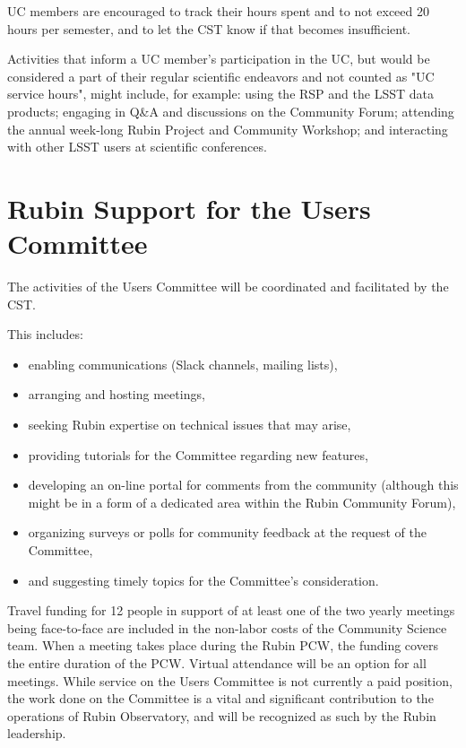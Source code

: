\documentclass[OPS,toc]{lsstdoc}
\begin{document}
UC members are encouraged to track their hours spent and to not exceed 20 hours per semester, and to let the CST know if that becomes insufficient. 

Activities that inform a UC member's participation in the UC, but would be considered a part of their regular scientific endeavors and not counted as "UC service hours", might include, for example: using the RSP and the LSST data products; engaging in Q\&A and discussions on the Community Forum; attending the annual week-long Rubin Project and Community Workshop; and interacting with other LSST users at scientific conferences.

\section{Rubin Support for the Users Committee}

The activities of the Users Committee will be coordinated and facilitated by the CST.

This includes:
\begin{itemize}
\item enabling communications (Slack channels, mailing lists),
\item arranging and hosting meetings,
\item seeking Rubin expertise on technical issues that may arise,
\item providing tutorials for the Committee regarding new features,
\item developing an on-line portal for comments from the community (although this might be in a form of a dedicated area within the Rubin Community Forum), 
\item organizing surveys or polls for community feedback at the request of the Committee, 
\item and suggesting timely topics for the Committee’s consideration.
\end{itemize}

Travel funding for 12 people in support of at least one of the two yearly meetings being face-to-face are included in the non-labor costs of the Community Science team.  
When a meeting takes place during the Rubin PCW, the funding covers the entire duration of the PCW.  
Virtual attendance will be an option for all meetings.
While service on the Users Committee is not currently a paid position, the work done on the Committee is a vital and significant contribution to the operations of Rubin Observatory, and will be recognized as such by the Rubin leadership. 
\end{document}
